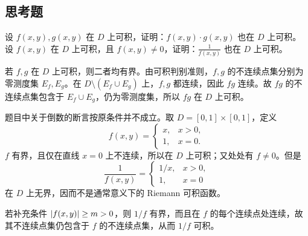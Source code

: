 \subsection{思考题}

\begin{xthought}[1]
设 $f(x,y),g(x,y)$ 在 $D$ 上可积，证明：$f(x,y)\cdot g(x,y)$ 也在 $D$ 上可积。设 $f(x,y)$ 在 $D$ 上可积，且 $f(x,y)\ne0$，证明：$\frac1{f(x,y)}$ 也在 $D$ 上可积。
\end{xthought}
\begin{xsolution}
若 $f,g$ 在 $D$ 上可积，则二者均有界。由可积判别准则，$f,g$ 的不连续点集分别为零测度集 $E_f,E_g$。在 $D\setminus(E_f\cup E_g)$ 上，$f,g$ 都连续，因此 $fg$ 连续。故 $fg$ 的不连续点集包含于 $E_f\cup E_g$，仍为零测度集，所以 $fg$ 在 $D$ 上可积。

题目中关于倒数的断言按原条件并不成立。取 $D=[0,1]\times[0,1]$，定义
\[
  f(x,y)=
  \begin{cases}
    x,&x>0,\\
    1,&x=0.
  \end{cases}
\]
$f$ 有界，且仅在直线 $x=0$ 上不连续，所以在 $D$ 上可积；又处处有 $f\ne0$。但是
\[
  \frac1{f(x,y)}=
  \begin{cases}
    1/x,&x>0,\\
    1,&x=0
  \end{cases}
\]
在 $D$ 上无界，因而不是通常意义下的 Riemann 可积函数。

若补充条件 $\lvert f(x,y)\rvert\ge m>0$，则 $1/f$ 有界，而且在 $f$ 的每个连续点处连续，故其不连续点集仍包含于 $f$ 的不连续点集，从而 $1/f$ 可积。
\end{xsolution}


